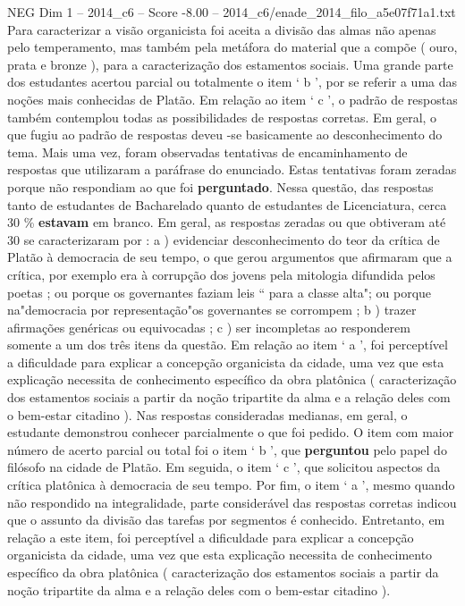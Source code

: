 \begin{textsample}{NEG Dim 1 – 2014\_c6 – Score -8.00 – 2014\_c6/enade\_2014\_filo\_a5e07f71a1.txt}
Para caracterizar a visão organicista foi aceita a divisão das almas não apenas pelo temperamento, mas também pela metáfora do material que a compõe ( ouro, prata e bronze ), para a caracterização dos estamentos sociais.
Uma grande parte dos estudantes acertou parcial ou totalmente o item ‘ b ’, por se referir a uma das noções mais conhecidas de Platão.
Em relação ao item ‘ c ’, o padrão de respostas também contemplou todas as possibilidades de respostas corretas.
Em geral, o que fugiu ao padrão de respostas deveu -se basicamente ao desconhecimento do tema.
Mais uma vez, foram observadas tentativas de encaminhamento de respostas que utilizaram a paráfrase do enunciado.
Estas tentativas foram zeradas porque não respondiam ao que foi \textbf{perguntado}.
Nessa questão, das respostas tanto de estudantes de Bacharelado quanto de estudantes de Licenciatura, cerca 30 \% \textbf{estavam} em branco.
Em geral, as respostas zeradas ou que obtiveram até 30 se caracterizaram por : a ) evidenciar desconhecimento do teor da crítica de Platão à democracia de seu tempo, o que gerou argumentos que afirmaram que a crítica, por exemplo era à corrupção dos jovens pela mitologia difundida pelos poetas ; ou porque os governantes faziam leis “ para a classe alta"; ou porque na"democracia por representação"os governantes se corrompem ; b ) trazer afirmações genéricas ou equivocadas ; c ) ser incompletas ao responderem somente a um dos três itens da questão.
Em relação ao item ‘ a ’, foi perceptível a dificuldade para explicar a concepção organicista da cidade, uma vez que esta explicação necessita de conhecimento específico da obra platônica ( caracterização dos estamentos sociais a partir da noção tripartite da alma e a relação deles com o bem-estar citadino ).
Nas respostas consideradas medianas, em geral, o estudante demonstrou conhecer parcialmente o que foi pedido.
O item com maior número de acerto parcial ou total foi o item ‘ b ’, que \textbf{perguntou} pelo papel do filósofo na cidade de Platão.
Em seguida, o item ‘ c ’, que solicitou aspectos da crítica platônica à democracia de seu tempo.
Por fim, o item ‘ a ’, mesmo quando não respondido na integralidade, parte considerável das respostas corretas indicou que o assunto da divisão das tarefas por segmentos é conhecido.
Entretanto, em relação a este item, foi perceptível a dificuldade para explicar a concepção organicista da cidade, uma vez que esta explicação necessita de conhecimento específico da obra platônica ( caracterização dos estamentos sociais a partir da noção tripartite da alma e a relação deles com o bem-estar citadino ).

\end{textsample}
